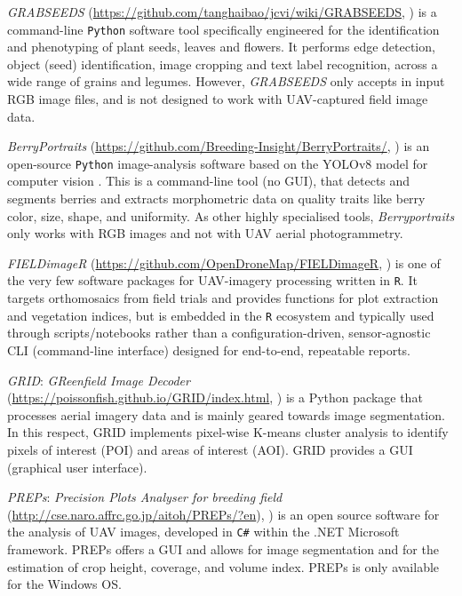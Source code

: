 \documentclass[drones,technicalnote,accept,pdftex,moreauthors]{Definitions/mdpi}
\begin{document}
\textit{GRABSEEDS} (\url{https://github.com/tanghaibao/jcvi/wiki/GRABSEEDS}, \cite{tang2024grabseeds}) is a command-line \texttt{Python} software tool specifically engineered for the identification and phenotyping of plant seeds, leaves and flowers.
It performs edge detection, object (seed) identification, image cropping and text label recognition, across a wide range of grains and legumes.
However, \textit{GRABSEEDS} only accepts in input RGB image files, and is not designed to work with UAV-captured field image data.

\textit{BerryPortraits} (\url{https://github.com/Breeding-Insight/BerryPortraits/}, \cite{loarca2024berryportraits}) is an open-source \texttt{Python} image-analysis software based on the YOLOv8 model for computer vision \cite{varghese2024yolov8}. 
This is a command-line tool (no GUI), that detects and segments berries and extracts morphometric data on quality traits like berry color, size, shape, and uniformity. 
As other highly specialised tools, \textit{Berryportraits} only works with RGB images and not with UAV aerial photogrammetry.

\textit{FIELDimageR} (\url{https://github.com/OpenDroneMap/FIELDimageR}, \cite{matias_fieldimager_2020}) is one of the very few software packages for UAV-imagery processing written in \texttt{R}. It targets orthomosaics from field trials and provides functions for plot extraction and vegetation indices, but is embedded in the \texttt{R} ecosystem and typically used through scripts/notebooks rather than a configuration-driven, sensor-agnostic CLI (command-line interface) designed for end-to-end, repeatable reports.

\textit{GRID}: \textit{GReenfield Image Decoder} (\url{https://poissonfish.github.io/GRID/index.html},
\cite{ChenZhang2020}) is a Python package that processes aerial imagery data and is mainly geared towards image segmentation. In this respect, GRID implements pixel-wise K-means cluster analysis to identify pixels of interest (POI) and areas of interest (AOI). GRID provides a GUI (graphical user interface).

\textit{PREPs}: \textit{Precision Plots Analyser for breeding field} (\url{http://cse.naro.affrc.go.jp/aitoh/PREPs/?en}), \cite{itoh2024preps}) is an open source software for the analysis of UAV images, developed in \verb|C#| within the .NET Microsoft framework. PREPs offers a GUI and allows for image segmentation and for the estimation of crop height, coverage, and volume index. PREPs is only available for the Windows OS.
\end{document}
